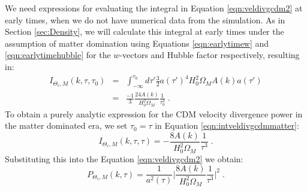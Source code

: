 \documentclass{aastex}
\begin{document}
We need expressions for evaluating
the integral in Equation \eqref{eqn:veldivgcdm2} at early times, when we
do not have numerical data from the simulation.  As in Section
\ref{sec:Density}, we will calculate this integral at early times under 
the assumption of matter domination using Equations \eqref{eqn:earlytimew} and \eqref{eqn:earlytimehubble} for the
$w$-vectors and Hubble factor respectively, resulting in:
\begin{equation}\label{eqn:intveldivgcdmmatter}
\begin{array}{rcl}
  I_{{\Theta_c},M}(k,\tau,\tau_0) %
           &=&
  \int_{-\infty}^{\tau_0} d\tau' \frac{3}{2} a(\tau')^4 H_0^2 \Omega_M
  A(k) a(\tau') \\[1em]
  &=& \frac{-1}{3} \frac{ 24 A(k) }{ H_0^2 \Omega_M} \frac{1}{\tau_0^3}\;.
\end{array}
\end{equation}
To obtain a purely analytic expression for the CDM velocity
divergence power in the matter dominated era, we set $\tau_0 =
\tau$ in Equation \eqref{eqn:intveldivgcdmmatter}:
\begin{equation}\label{eqn:intveldivgcdmmatter2}
 I_{{\Theta_c},M}(k,\tau,\tau)  = 
                                                                     -\frac{8
                                                                     A(k)}{H_0^2
                                                                     \Omega_M}
                                                                     \frac{1}{\tau^3} \;.
\end{equation}
Substituting this into the Equation \eqref{eqn:veldivgcdm2} we obtain:
\begin{equation}\label{veldivgcdmmatter}
  P_{\Theta_c,M}(k,\tau) = \frac{1}{a^2(\tau)} \bigg| \frac{8
    A(k)}{H_0^2 \Omega_M} \frac{1}{\tau^3} \bigg|^2 \;.
\end{equation}
\end{document}
